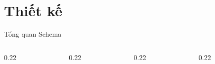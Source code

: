 \section{Thiết kế}

\begin{frame}{Tổng quan Schema}
    \begin{columns}[c]
        \begin{column}{0.22\textwidth}
        \end{column}
        \begin{column}{0.22\textwidth}
        \end{column}
        \begin{column}{0.22\textwidth}
        \end{column}
        \begin{column}{0.22\textwidth}
        \end{column}
    \end{columns}

    \vspace{0.6em}


\end{frame}
